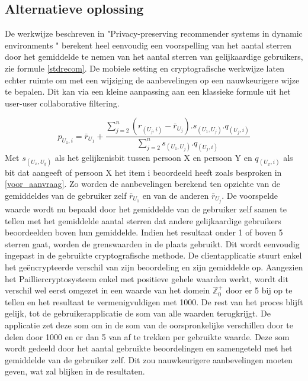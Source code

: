 \subsection{Alternatieve oplossing}
De werkwijze beschreven in "Privacy-preserving recommender systems in dynamic environments \cite{ZErkinDyn}" berekent heel eenvoudig een voorspelling van het aantal sterren door het gemiddelde te nemen van het aantal sterren van gelijkaardige gebruikers, zie formule \ref{stdrecom}. De mobiele setting en cryptografische werkwijze laten echter ruimte om met een wijziging de aanbevelingen op een nauwkeurigere wijze te bepalen. Dit kan via een kleine aanpassing aan een klassieke formule uit het user-user collaborative filtering.

\begin{equation}\label{stdrecom}p_{U_1,i} = \bar{r}_{U_1} + \frac{\sum_{j=2}^{n}(r_{(U_j,i)} - \bar{r}_{U_j}).s_{(U_1,U_j)}.q_{(U_j,i)}}{\sum_{j=2}^{n} s_{(U_1,U_j)}.q_{(U_j,i)}}
\end{equation}
Met $s_{(U_x,U_y)}$ als het gelijkenisbit tussen persoon X en persoon Y en $q_{(U_x,i)}$ als bit dat aangeeft of persoon X het item i beoordeeld heeft zoals besproken in \ref{voor_aanvraag}.
Zo worden de aanbevelingen berekend ten opzichte van de gemiddeldes van de gebruiker zelf $\bar{r}_{U_1}$ en van de anderen $\bar{r}_{U_j}$. De voorspelde waarde wordt nu bepaald door het gemiddelde van de gebruiker zelf samen te tellen met het gemiddelde aantal sterren dat andere gelijkaardige gebruikers beoordeelden boven hun gemiddelde. Indien het resultaat onder 1 of boven 5 sterren gaat, worden de grenswaarden in de plaats gebruikt.
Dit wordt eenvoudig ingepast in de gebruikte cryptografische methode. De clientapplicatie stuurt enkel het ge\"encrypteerde verschil van zijn beoordeling en zijn gemiddelde op. Aangezien het Pailliercryptosysteem enkel met positieve gehele waarden werkt, wordt dit verschil wel eerst omgezet in een waarde van het domein $\mathbb{Z}^{+}_{0}$ door er 5 bij op te tellen en het resultaat te vermenigvuldigen met 1000. De rest van het proces blijft gelijk, tot de gebruikerapplicatie de som van alle waarden terugkrijgt. De applicatie zet deze som om in de som van de oorspronkelijke verschillen door te delen door 1000 en er dan 5 van af te trekken per gebruikte waarde. Deze som wordt gedeeld door het aantal gebruikte beoordelingen en samengeteld met het gemiddelde van de gebruiker zelf. Dit zou nauwkeurigere aanbevelingen moeten geven, wat zal blijken in de resultaten.